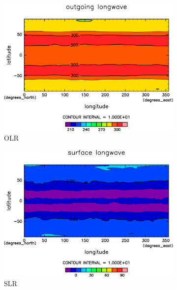 \documentclass[body]{subfiles}
\begin{document}
\begin{figure}[t]
	\centering
	\begin{subfigure}{.4\textwidth}
		\centering
		\includegraphics[width=\columnwidth]{S1500-nc/OLR,time=3650:4015-crop-rotate.pdf}
		\caption{OLR \hmu*{[W/m^{-2}]}}\label{S1500ncOLR}
	\end{subfigure}
	\begin{subfigure}{.4\textwidth}
		\centering
		\includegraphics[width=\columnwidth]{S1500-nc/SLR,time=3650:4015-crop-rotate.pdf}
		\caption{SLR\hmu*{[W/m^{-2}]}}\label{S1500ncSLR}
	\end{subfigure}
	\begin{subfigure}{.4\textwidth}
		\centering

\end{subfigure}
\end{figure}
\end{document}
